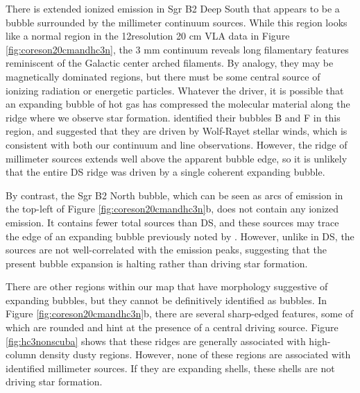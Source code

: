 \documentclass[twocolumn]{aastex61}
\begin{document}

There is extended ionized emission in Sgr B2 Deep South that appears to be a
bubble surrounded by the millimeter continuum sources.  While this region looks
like a normal \hii region in the 12\arcsec resolution 20 cm
VLA data in Figure \ref{fig:coreson20cmandhc3n}, the 3 mm continuum reveals long
filamentary features reminiscent of the Galactic center arched filaments.  By
analogy, they may be magnetically dominated regions, but there must be some
central source of ionizing radiation or energetic particles.  Whatever the
driver, it is possible that an expanding bubble of hot gas has compressed the
molecular material along the ridge where we observe star formation.
\citet{Martin-Pintado1999a} identified their bubbles B and F in this region,
and suggested that they are driven by Wolf-Rayet stellar winds, which is
consistent with both our continuum and line observations.  However, the ridge
of millimeter sources extends well above the apparent bubble edge, so it is
unlikely that the entire DS ridge was driven by a single coherent expanding
bubble.

By contrast, the Sgr B2 North bubble, which can be seen as arcs of
\cyanoacetylene emission in the top-left of Figure
\ref{fig:coreson20cmandhc3n}b, does not contain any ionized emission.  It
contains fewer total sources than DS, and these sources may trace the edge of
an expanding bubble previously noted by \citet{de-Vicente1997a}.  However,
unlike in DS, the sources are not well-correlated with the \cyanoacetylene
emission peaks, suggesting that the present bubble expansion is halting rather
than driving star formation.

There are other regions within our map that have morphology suggestive of
expanding bubbles, but they cannot be definitively identified as bubbles.  In
Figure \ref{fig:coreson20cmandhc3n}b, there are several sharp-edged
\cyanoacetylene features, some of which are rounded and hint at the presence of
a central driving source. Figure \ref{fig:hc3nonscuba} shows that these ridges
are generally associated with high-column density dusty regions.  However, none
of these regions are associated with identified millimeter sources.  If they
are expanding shells, these shells are not driving star formation.

% 
\end{document}
